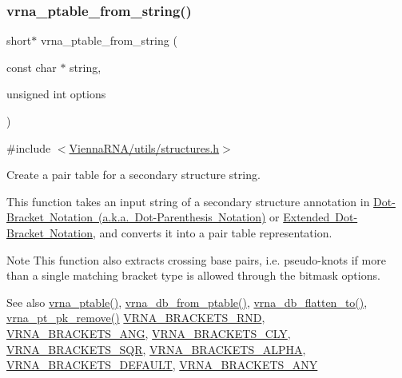 \subsubsection{\texorpdfstring{vrna\_ptable\_from\_string()}{vrna\_ptable\_from\_string()}}
{\footnotesize\ttfamily short$\ast$ vrna\+\_\+ptable\+\_\+from\+\_\+string (\begin{DoxyParamCaption}\item[{const char $\ast$}]{string,  }\item[{unsigned int}]{options }\end{DoxyParamCaption})}



{\ttfamily \#include $<$\mbox{\hyperlink{utils_2structures_8h}{Vienna\+R\+N\+A/utils/structures.\+h}}$>$}



Create a pair table for a secondary structure string. 

This function takes an input string of a secondary structure annotation in \mbox{\hyperlink{rna_structure_notations_dot-bracket-notation}{Dot-\/\+Bracket Notation (a.\+k.\+a. Dot-\/\+Parenthesis Notation)}} or \mbox{\hyperlink{rna_structure_notations_dot-bracket-ext-notation}{Extended Dot-\/\+Bracket Notation}}, and converts it into a pair table representation.

\begin{DoxyNote}{Note}
This function also extracts crossing base pairs, i.\+e. pseudo-\/knots if more than a single matching bracket type is allowed through the bitmask {\ttfamily options}.
\end{DoxyNote}
\begin{DoxySeeAlso}{See also}
\mbox{\hyperlink{group__struct__utils__pair__table_gae829fb8bb7f694c12a9c0bbc34c77c60}{vrna\+\_\+ptable()}}, \mbox{\hyperlink{group__struct__utils__dot__bracket_gaf9ecd0d7877fecdbb0292e24f40283d5}{vrna\+\_\+db\+\_\+from\+\_\+ptable()}}, \mbox{\hyperlink{group__struct__utils__dot__bracket_ga690425199c8b71545e7196e3af1436f8}{vrna\+\_\+db\+\_\+flatten\+\_\+to()}}, \mbox{\hyperlink{group__struct__utils__pair__table_gae8f31c859b48f97b8af889e914e4d040}{vrna\+\_\+pt\+\_\+pk\+\_\+remove()}} \mbox{\hyperlink{group__struct__utils__dot__bracket_gac92d5fa7c6625bce2670ece510a24fbd}{V\+R\+N\+A\+\_\+\+B\+R\+A\+C\+K\+E\+T\+S\+\_\+\+R\+ND}}, \mbox{\hyperlink{group__struct__utils__dot__bracket_ga863e03f7f73f10fc9bbcbefbdda4bec8}{V\+R\+N\+A\+\_\+\+B\+R\+A\+C\+K\+E\+T\+S\+\_\+\+A\+NG}}, \mbox{\hyperlink{group__struct__utils__dot__bracket_gaf41be40e79cb756c4e0bb8edb4d803d2}{V\+R\+N\+A\+\_\+\+B\+R\+A\+C\+K\+E\+T\+S\+\_\+\+C\+LY}}, \mbox{\hyperlink{group__struct__utils__dot__bracket_ga60525d61d7496eeea490a37f3d6bf757}{V\+R\+N\+A\+\_\+\+B\+R\+A\+C\+K\+E\+T\+S\+\_\+\+S\+QR}}, \mbox{\hyperlink{group__struct__utils__dot__bracket_ga7e3f630af8d69bb0e917145aacf2f96d}{V\+R\+N\+A\+\_\+\+B\+R\+A\+C\+K\+E\+T\+S\+\_\+\+A\+L\+P\+HA}}, \mbox{\hyperlink{group__struct__utils__dot__bracket_ga559ebf76b1b289f85309f4206e99aa1a}{V\+R\+N\+A\+\_\+\+B\+R\+A\+C\+K\+E\+T\+S\+\_\+\+D\+E\+F\+A\+U\+LT}}, \mbox{\hyperlink{group__struct__utils__dot__bracket_ga013a9da903462d2f2b037f0c6ffb46e4}{V\+R\+N\+A\+\_\+\+B\+R\+A\+C\+K\+E\+T\+S\+\_\+\+A\+NY}}
\end{DoxySeeAlso}

